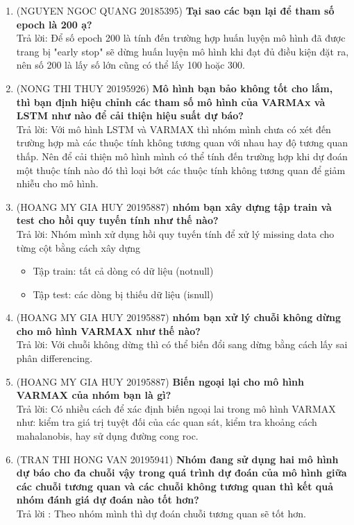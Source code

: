 \documentclass[13pt]{report}
\numberwithin{equation}{section}
\begin{document}
\begin{enumerate}
    \item (NGUYEN NGOC QUANG 20185395)\textbf{ Tại sao các bạn lại để tham số epoch là 200 ạ?}\\
    Trả lời:
    Để số epoch 200 là tính đến trường hợp huấn luyện mô hình đã được trang bị "early stop" \- sẽ dừng huấn luyện mô hình khi đạt đủ điều kiện đặt ra, nên số 200 là lấy số lớn cũng có thể lấy 100 hoặc 300.
    
    \item (NONG THI THUY 20195926)\textbf{ Mô hình bạn bảo không tốt cho lắm, thì bạn định hiệu chỉnh các tham số mô hình của VARMAx và LSTM như nào để cải thiện hiệu suất dự báo?}\\
    Trả lời:
Với mô hình LSTM và VARMAX thì nhóm mình chưa có xét đến trường hợp mà các thuộc tính không tương quan với nhau hay độ tương quan thấp. Nên để cải thiện mô hình mình có thể tính đến trường hợp khi dự đoán một thuộc tính nào đó thì loại bớt các thuộc tính không tương quan để giảm nhiễu cho mô hình.

    \item (HOANG MY GIA HUY 20195887)\textbf{ nhóm bạn xây dựng tập train và test cho hồi quy tuyến tính như thế nào?}\\
    Trả lời: Nhóm mình xử dụng hồi quy tuyến tính để xử lý missing data cho từng cột bằng cách xây dựng 
    \begin{itemize}
        \item Tập train: tất cả dòng có dữ liệu (notnull)
        \item Tập test: các dòng bị thiếu dữ liệu (isnull)
    \end{itemize}
    
    \item (HOANG MY GIA HUY 20195887)\textbf{ nhóm bạn xử lý chuỗi không dừng cho mô hình VARMAX như thế nào?}\\
     Trả lời: Với chuỗi không dừng thì có thể biến đổi sang dừng bằng cách lấy sai phân differencing.
  
    \item (HOANG MY GIA HUY 20195887)\textbf{ Biến ngoại lại cho mô hình VARMAX của nhóm bạn là gì?}\\
    Trả lời: Có nhiều cách để xác định biến ngoại lai trong mô hình VARMAX như: kiểm tra giá trị tuyệt đối của các quan sát, kiểm tra khoảng cách mahalanobis, hay sử dụng đường cong roc. 
    \item (TRAN THI HONG VAN 20195941)\textbf{
    Nhóm đang sử dụng hai mô hình dự báo cho đa chuỗi vậy trong quá trình dự đoán của mô hình giữa các chuỗi tương quan và các chuỗi không tương quan thì kết quả nhóm đánh giá dự đoán nào tốt hơn?}\\
    Trả lời : Theo nhóm mình thì dự đoán chuỗi tương quan sẽ tốt hơn.
    

\end{enumerate}
\end{document}
